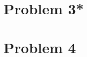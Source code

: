 \documentclass[a4paper,pdftex,10pt]{article}
\begin{document}
\clearpage
\section{Problem 3*}















\clearpage
\section{Problem 4}
\end{document}
